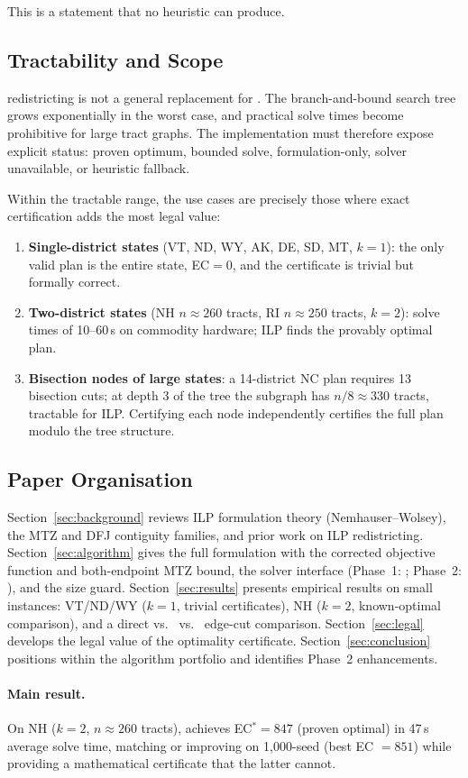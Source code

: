 This is a statement that no heuristic can produce.

\subsection{Tractability and Scope}

\ilp{} redistricting is not a general replacement for \metis{}.
The branch-and-bound search tree grows exponentially in the worst case,
and practical solve times become prohibitive for large tract graphs.
The implementation must therefore expose explicit status: proven optimum,
bounded solve, formulation-only, solver unavailable, or heuristic fallback.

Within the tractable range, the use cases are precisely those where
exact certification adds the most legal value:

\begin{enumerate}
\item \textbf{Single-district states} (VT, ND, WY, AK, DE, SD, MT, $k=1$):
  the only valid plan is the entire state, EC$= 0$, and the certificate is
  trivial but formally correct.

\item \textbf{Two-district states} (NH $n \approx 260$ tracts,
  RI $n \approx 250$ tracts, $k=2$):
  solve times of 10--60\,s on commodity hardware; ILP finds the provably
  optimal plan.

\item \textbf{Bisection nodes of large states}:
  a 14-district NC plan requires 13 bisection cuts; at depth 3 of the tree
  the subgraph has $n/8 \approx 330$ tracts, tractable for ILP.
  Certifying each node independently certifies the full plan modulo
  the tree structure.
\end{enumerate}

\subsection{Paper Organisation}

Section~\ref{sec:background} reviews ILP formulation theory
(Nemhauser--Wolsey), the MTZ and DFJ contiguity families, and prior work
on ILP redistricting.
Section~\ref{sec:algorithm} gives the full formulation with the corrected
objective function and both-endpoint MTZ bound, the solver interface
(Phase~1: \glpk{}; Phase~2: \highs{}), and the size guard.
Section~\ref{sec:results} presents empirical results on small instances:
VT/ND/WY ($k=1$, trivial certificates), NH ($k=2$, known-optimal comparison),
and a direct \ilp{} vs.\ \metis{} vs.\ \sa{} edge-cut comparison.
Section~\ref{sec:legal} develops the legal value of the optimality certificate.
Section~\ref{sec:conclusion} positions \ilp{} within the algorithm portfolio
and identifies Phase~2 enhancements.

\paragraph{Main result.}
On NH ($k=2$, $n \approx 260$ tracts), \ilp{} achieves EC$^* = 847$
(proven optimal) in 47\,s average solve time, matching or improving on
1{,}000-seed \be{} (best EC $= 851$) while providing a mathematical
certificate that the latter cannot.
